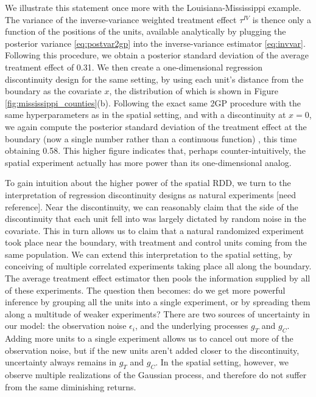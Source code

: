 \documentclass[letter]{article}
\newcommand{\invvar}{\tau^{IV}}
\begin{document}
We illustrate this statement once more with the Louisiana-Mississippi
example. The variance of the inverse-variance weighted treatment effect
\(\invvar\) is thence only a function of the positions of the units,
available analytically by plugging the posterior variance
\eqref{eq:postvar2gp} into the inverse-variance estimator
\eqref{eq:invvar}. Following this procedure, we obtain a posterior
standard deviation of the average treatment effect of 0.31. We then
create a one-dimensional regression discontinuity design for the same
setting, by using each unit's distance from the boundary as the
covariate \(x\), the distribution of which is shown in Figure
\ref{fig:mississippi_counties}(b). Following the exact same 2GP
procedure with the same hyperparameters as in the spatial setting, and
with a discontinuity at \(x=0\), we again compute the posterior standard
deviation of the treatment effect at the boundary (now a single number
rather than a continuous function) , this time obtaining 0.58. This
higher figure indicates that, perhaps counter-intuitively, the spatial
experiment actually has more power than its one-dimensional analog.

To gain intuition about the higher power of the spatial RDD, we turn to
the interpretation of regression discontinuity designs as natural
experiments {[}need reference{]}. Near the discontinuity, we can
reasonably claim that the side of the discontinuity that each unit fell
into was largely dictated by random noise in the covariate. This in turn
allows us to claim that a natural randomized experiment took place near
the boundary, with treatment and control units coming from the same
population. We can extend this interpretation to the spatial setting, by
conceiving of multiple correlated experiments taking place all along the
boundary. The average treatment effect estimator then pools the
information supplied by all of these experiments. The question then
becomes: do we get more powerful inference by grouping all the units
into a single experiment, or by spreading them along a multitude of
weaker experiments? There are two sources of uncertainty in our model:
the observation noise \(\epsilon_i\), and the underlying processes
\(g_T\) and \(g_C\). Adding more units to a single experiment allows us
to cancel out more of the observation noise, but if the new units aren't
added closer to the discontinuity, uncertainty always remains in \(g_T\)
and \(g_C\). In the spatial setting, however, we observe multiple
realizations of the Gaussian process, and therefore do not suffer from
the same diminishing returns.
    
\end{document}

